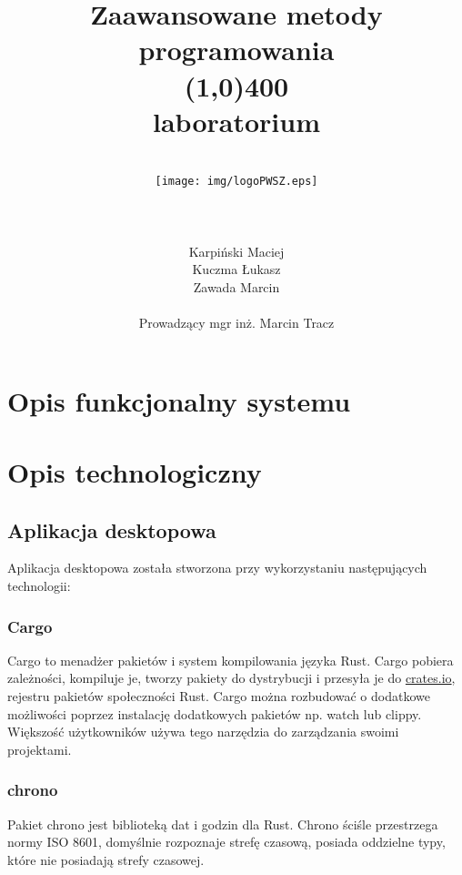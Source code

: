 \documentclass[12pt,a4paper]{article}
\author{
	\\\texttt{[image: img/logoPWSZ.eps]} \\\\\\\\
	\hfill Karpiński Maciej\\
	\hfill Kuczma Łukasz\\
	\hfill Zawada Marcin\\\\
	\hfill Prowadzący mgr inż. Marcin Tracz
	}
\title{\textbf{Zaawansowane metody programowania}\\\line(1,0){400}\\\textbf{laboratorium}}
\date{}
\begin{document}
	\maketitle
	\thispagestyle{fancy}
	\fancyhf{}
	\rhead{\textcolor{gray}{\footnotesize Państwowa Wyższa Szkoła Zawodowa im. Witelona w Legnicy\\Informatyka, rok III\\Semestr letni 2020/2021}}	
	\renewcommand{\headrulewidth}{0pt}
	\clearpage

	\pagestyle{fancy}
	\rfoot{\thepage}	
	\tableofcontents
	\newpage

	\section{Opis funkcjonalny systemu}	
	\newpage
	
	\section{Opis technologiczny}
		\subsection{Aplikacja desktopowa}
			
			\indent Aplikacja desktopowa została stworzona przy wykorzystaniu następujących technologii:
				\subsubsection{Cargo}

					\indent Cargo to menadżer pakietów i system kompilowania języka Rust. Cargo pobiera zależności, kompiluje je, tworzy pakiety do dystrybucji i przesyła je do
					\url{crates.io}, rejestru pakietów społeczności Rust. Cargo można rozbudować o dodatkowe możliwości poprzez instalację dodatkowych pakietów np. watch lub clippy. Większość
					użytkowników używa tego narzędzia do zarządzania swoimi projektami. 
				\subsubsection{chrono}

					\indent Pakiet chrono jest biblioteką dat i godzin dla Rust. Chrono ściśle przestrzega normy ISO 8601, domyślnie rozpoznaje strefę czasową,
				 	posiada oddzielne typy, które nie posiadają strefy czasowej. 
\end{document}
